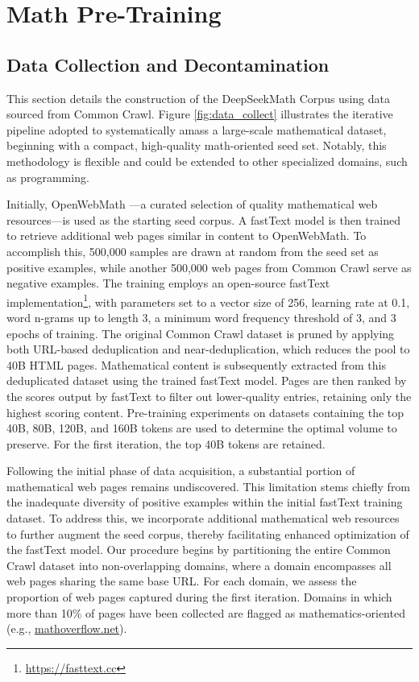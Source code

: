 \section{Math Pre-Training}

\subsection{Data Collection and Decontamination} This section details the construction of the DeepSeekMath Corpus using data sourced from Common Crawl. Figure \ref{fig:data_collect} illustrates the iterative pipeline adopted to systematically amass a large-scale mathematical dataset, beginning with a compact, high-quality math-oriented seed set. Notably, this methodology is flexible and could be extended to other specialized domains, such as programming.

Initially, OpenWebMath \citep{openwebmath}—a curated selection of quality mathematical web resources—is used as the starting seed corpus. A fastText model \citep{joulin2016fasttext} is then trained to retrieve additional web pages similar in content to OpenWebMath. To accomplish this, 500,000 samples are drawn at random from the seed set as positive examples, while another 500,000 web pages from Common Crawl serve as negative examples. The training employs an open-source fastText implementation\footnote{\url{https://fasttext.cc}}, with parameters set to a vector size of 256, learning rate at 0.1, word n-grams up to length 3, a minimum word frequency threshold of 3, and 3 epochs of training. The original Common Crawl dataset is pruned by applying both URL-based deduplication and near-deduplication, which reduces the pool to 40B HTML pages. Mathematical content is subsequently extracted from this deduplicated dataset using the trained fastText model. Pages are then ranked by the scores output by fastText to filter out lower-quality entries, retaining only the highest scoring content. Pre-training experiments on datasets containing the top 40B, 80B, 120B, and 160B tokens are used to determine the optimal volume to preserve. For the first iteration, the top 40B tokens are retained.

Following the initial phase of data acquisition, a substantial portion of mathematical web pages remains undiscovered. This limitation stems chiefly from the inadequate diversity of positive examples within the initial fastText training dataset. To address this, we incorporate additional mathematical web resources to further augment the seed corpus, thereby facilitating enhanced optimization of the fastText model. Our procedure begins by partitioning the entire Common Crawl dataset into non-overlapping domains, where a domain encompasses all web pages sharing the same base URL. For each domain, we assess the proportion of web pages captured during the first iteration. Domains in which more than 10\% of pages have been collected are flagged as mathematics-oriented (e.g., \url{mathoverflow.net}).

